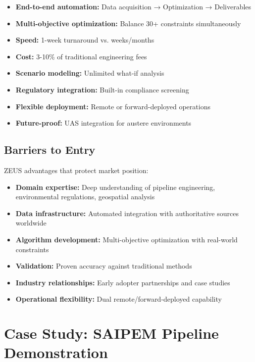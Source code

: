 \documentclass[11pt,letterpaper]{article}
\begin{document}
\begin{itemize}[leftmargin=*]
    \item \textbf{End-to-end automation:} Data acquisition → Optimization → Deliverables
    \item \textbf{Multi-objective optimization:} Balance 30+ constraints simultaneously
    \item \textbf{Speed:} 1-week turnaround vs. weeks/months
    \item \textbf{Cost:} 3-10\% of traditional engineering fees
    \item \textbf{Scenario modeling:} Unlimited what-if analysis
    \item \textbf{Regulatory integration:} Built-in compliance screening
    \item \textbf{Flexible deployment:} Remote or forward-deployed operations
    \item \textbf{Future-proof:} UAS integration for austere environments
\end{itemize}

\subsection{Barriers to Entry}

ZEUS advantages that protect market position:

\begin{itemize}[leftmargin=*]
    \item \textbf{Domain expertise:} Deep understanding of pipeline engineering, environmental regulations, geospatial analysis
    \item \textbf{Data infrastructure:} Automated integration with authoritative sources worldwide
    \item \textbf{Algorithm development:} Multi-objective optimization with real-world constraints
    \item \textbf{Validation:} Proven accuracy against traditional methods
    \item \textbf{Industry relationships:} Early adopter partnerships and case studies
    \item \textbf{Operational flexibility:} Dual remote/forward-deployed capability
\end{itemize}

\newpage

\section{Case Study: SAIPEM Pipeline Demonstration}
\end{document}
